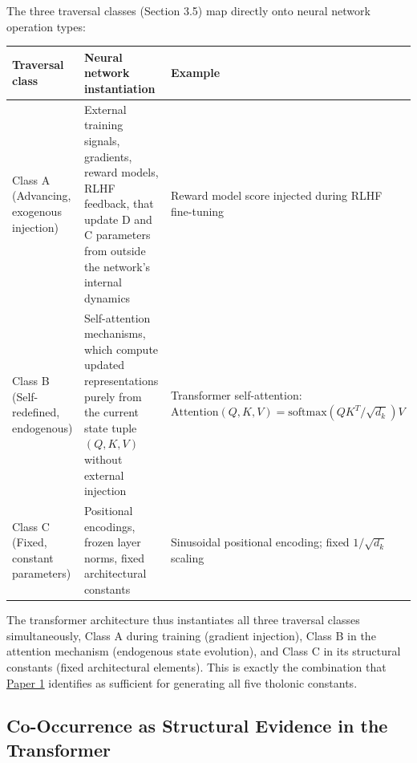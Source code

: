 \documentclass[12pt]{article}
\begin{document}
The three traversal classes (Section 3.5) map directly onto neural
network operation types:

\begin{longtable}[]{@{}
  >{\raggedright\arraybackslash}p{}
  >{\raggedright\arraybackslash}p{}
  >{\raggedright\arraybackslash}p{}@{}}
\toprule\noalign{}
\begin{minipage}[b]{\linewidth}\raggedright
Traversal class
\end{minipage} & \begin{minipage}[b]{\linewidth}\raggedright
Neural network instantiation
\end{minipage} & \begin{minipage}[b]{\linewidth}\raggedright
Example
\end{minipage} \\
\midrule\noalign{}
\endhead
\bottomrule\noalign{}
\endlastfoot
Class A (Advancing, exogenous injection) & External training signals,
gradients, reward models, RLHF feedback, that update D and C parameters
from outside the network's internal dynamics & Reward model score
injected during RLHF fine-tuning \\
Class B (Self-redefined, endogenous) & Self-attention mechanisms, which
compute updated representations purely from the current state tuple
\((Q, K, V)\) without external injection & Transformer self-attention:
\(\text{Attention}(Q,K,V) = \text{softmax}(QK^T/\sqrt{d_k})V\) \\
Class C (Fixed, constant parameters) & Positional encodings, frozen
layer norms, fixed architectural constants & Sinusoidal positional
encoding; fixed \(1/\sqrt{d_k}\) scaling \\
\end{longtable}

The transformer architecture thus instantiates all three traversal
classes simultaneously, Class A during training (gradient injection),
Class B in the attention mechanism (endogenous state evolution), and
Class C in its structural constants (fixed architectural elements). This
is exactly the combination that
\href{https://github.com/baardev/truevalue/blob/main/docnav/Research/papers/1_recursive-tholonic-five-constants/1_recursive-tholonic-five-constants.pdf}{Paper
1} identifies as sufficient for generating all five tholonic constants.

\subsection{Co-Occurrence as Structural Evidence in the Transformer}\label{co-occurrence-as-structural-evidence-in-the-transformer}
\end{document}
